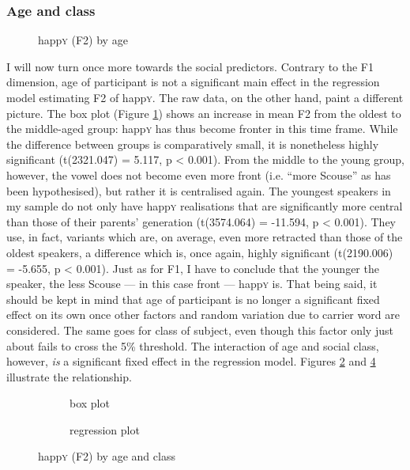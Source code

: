 \subsubsection{Age and class}
\label{sec.prod.res.vow.happy.f2.ageclass}

\begin{figure}[h!]
	\centering
		\resizebox{.5\linewidth}{!}{} 
	\caption{happ\textsc{y} (F2) by age}
	\label{fig.box.f2w.happy.tot}
\end{figure}

I will now turn once more towards the social predictors.
Contrary to the F1 dimension, age of participant is not a significant main effect in the regression model estimating F2 of happ\textsc{y}.
The raw data, on the other hand, paint a different picture.
The box plot (Figure \ref{fig.box.f2w.happy.tot}) shows an increase in mean F2 from the oldest to the middle-aged group: happ\textsc{y} has thus become fronter in this time frame.
While the difference between groups is comparatively small, it is nonetheless highly significant (t(2321.047) = 5.117, p < 0.001).
From the middle to the young group, however, the vowel does not become even more front (i.e. ``more Scouse'' as has been hypothesised), but rather it is centralised again.
The youngest speakers in my sample do not only have happ\textsc{y} realisations that are significantly more central than those of their parents' generation (t(3574.064) = -11.594, p < 0.001).
They use, in fact, variants which are, on average, even more retracted than those of the oldest speakers, a difference which is, once again, highly significant (t(2190.006) = -5.655, p < 0.001).
Just as for F1, I have to conclude that the younger the speaker, the less Scouse --- in this case front --- happ\textsc{y} is.
That being said, it should be kept in mind that age of participant is no longer a significant fixed effect on its own once other factors and random variation due to carrier word are considered.
The same goes for class of subject, even though this factor only just about fails to cross the 5\% threshold.
The interaction of age and social class, however, \emph{is} a significant fixed effect in the regression model.
Figures \ref{fig.box.f2w.happy.ageclass} and \ref{fig.scatter.f2w.happy.ageclass} illustrate the relationship.

\begin{figure}[h!]
	\centering
	\begin{subfigure}{.49\textwidth}
		\centering
			\resizebox{\linewidth}{!}{} 
		\caption{box plot}
		\label{fig.box.f2w.happy.ageclass}
	\end{subfigure}
	\begin{subfigure}{.49\textwidth}
		\centering
			\resizebox{\linewidth}{!}{} 
		\caption{regression plot}
		\label{fig.scatter.f2w.happy.ageclass}
	\end{subfigure}
	\caption{happ\textsc{y} (F2) by age and class}
\end{figure}

